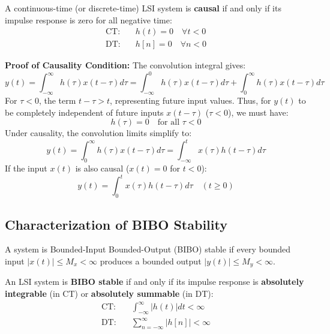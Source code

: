 \documentclass[12pt,a4paper]{article}
\begin{document}
\begin{tcolorbox}[defbox, title={\textbf{Causality Criterion for LSI Systems}}]
A continuous-time (or discrete-time) LSI system is \textbf{causal} if and only if its impulse response is zero for all negative time:
\begin{align}
  \text{CT:} \quad &h(t) = 0 \quad \forall t < 0 \\
  \text{DT:} \quad &h[n] = 0 \quad \forall n < 0
\end{align}
\end{tcolorbox}

\textbf{Proof of Causality Condition:}
The convolution integral gives:
\begin{equation}
  y(t) = \int_{-\infty}^{\infty} h(\tau) x(t - \tau) d\tau = \int_{-\infty}^0 h(\tau) x(t - \tau) d\tau + \int_0^{\infty} h(\tau) x(t - \tau) d\tau
\end{equation}
For $\tau < 0$, the term $t - \tau > t$, representing future input values. Thus, for $y(t)$ to be completely independent of future inputs $x(t - \tau)$ ($\tau < 0$), we must have:
\begin{equation}
  h(\tau) = 0 \quad \text{for all } \tau < 0
\end{equation}
Under causality, the convolution limits simplify to:
\begin{equation}
  y(t) = \int_0^{\infty} h(\tau) x(t - \tau) d\tau = \int_{-\infty}^{t} x(\tau) h(t - \tau) d\tau
\end{equation}
If the input $x(t)$ is also causal ($x(t) = 0$ for $t < 0$):
\begin{equation}
  y(t) = \int_0^t x(\tau) h(t - \tau) d\tau \quad (t \ge 0)
\end{equation}

\subsection{Characterization of BIBO Stability}
A system is Bounded-Input Bounded-Output (BIBO) stable if every bounded input $|x(t)| \le M_x < \infty$ produces a bounded output $|y(t)| \le M_y < \infty$.

\begin{tcolorbox}[formulabox, title={\textbf{BIBO Stability Criterion for LSI Systems}}]
An LSI system is \textbf{BIBO stable} if and only if its impulse response is \textbf{absolutely integrable} (in CT) or \textbf{absolutely summable} (in DT):
\begin{align}
  \text{CT:} \quad &\int_{-\infty}^{\infty} |h(t)| dt < \infty \\
  \text{DT:} \quad &\sum_{n=-\infty}^{\infty} |h[n]| < \infty
\end{align}
\end{tcolorbox}
\end{document}
